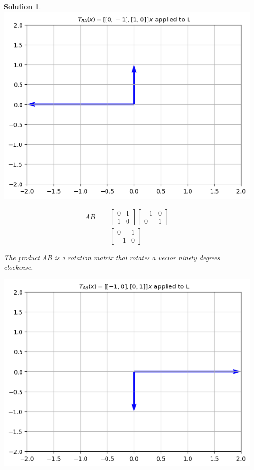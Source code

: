 \documentclass{article}
\newtheorem*{solution}{Solution}
\begin{document}
\begin{solution}
\includegraphics[scale=0.5, center]{Lrot90ccw} 

\begin{align*}
AB &= \begin{bmatrix}0 & 1 \\ 1 & 0 \end{bmatrix} 
\begin{bmatrix}-1 & 0 \\ 0 & 1 \end{bmatrix} \\
&= \begin{bmatrix}0 & 1 \\ -1 & 0 \end{bmatrix} 
\end{align*}

The product AB is a rotation matrix that rotates a vector ninety degrees clockwise. \\
\end{solution}

\includegraphics[scale=0.5, center]{Lrot90cw} 
\end{document}
